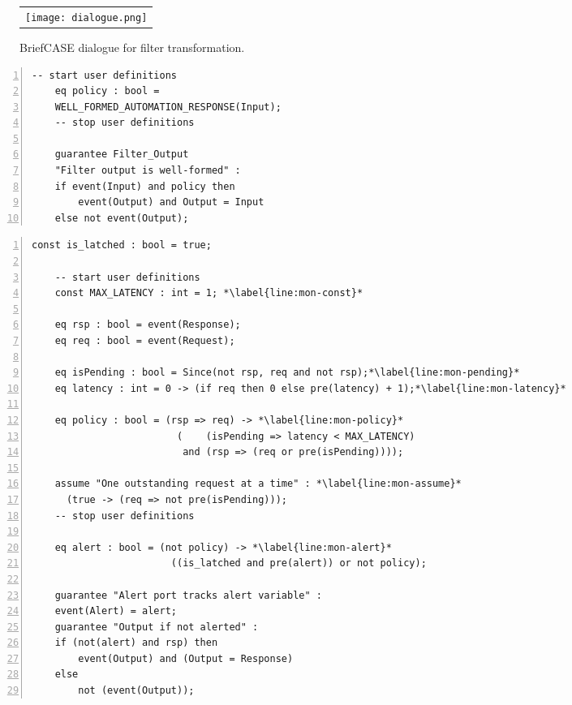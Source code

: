 \begin{figure}
  \begin{center}
    \begin{tabular}{c}
    \texttt{[image: dialogue.png]}
    \end{tabular}
  \end{center}
  \caption{BriefCASE dialogue for filter transformation.}
  \label{fig:dialogue}
\end{figure}

\newsavebox{\flt}
\begin{lrbox}{\flt}
  \begin{lstlisting}[style=agree,numbers=left]
    -- start user definitions
    eq policy : bool = 
    WELL_FORMED_AUTOMATION_RESPONSE(Input);
    -- stop user definitions

    guarantee Filter_Output
    "Filter output is well-formed" :
    if event(Input) and policy then 
        event(Output) and Output = Input
    else not event(Output);
  \end{lstlisting}
\end{lrbox}

\newsavebox{\mntr}
\begin{lrbox}{\mntr}
  \begin{lstlisting}[style=agree,numbers=left]
    const is_latched : bool = true;

    -- start user definitions
    const MAX_LATENCY : int = 1; *\label{line:mon-const}*
        
    eq rsp : bool = event(Response);
    eq req : bool = event(Request);

    eq isPending : bool = Since(not rsp, req and not rsp);*\label{line:mon-pending}*
    eq latency : int = 0 -> (if req then 0 else pre(latency) + 1);*\label{line:mon-latency}*
    
    eq policy : bool = (rsp => req) -> *\label{line:mon-policy}*
                         (    (isPending => latency < MAX_LATENCY)   
                          and (rsp => (req or pre(isPending))));

    assume "One outstanding request at a time" : *\label{line:mon-assume}*
      (true -> (req => not pre(isPending))); 
    -- stop user definitions
    
    eq alert : bool = (not policy) -> *\label{line:mon-alert}*
                        ((is_latched and pre(alert)) or not policy);
                          
    guarantee "Alert port tracks alert variable" :
    event(Alert) = alert;
    guarantee "Output if not alerted" :
    if (not(alert) and rsp) then
        event(Output) and (Output = Response)
    else
        not (event(Output));    
  \end{lstlisting}
\end{lrbox}

